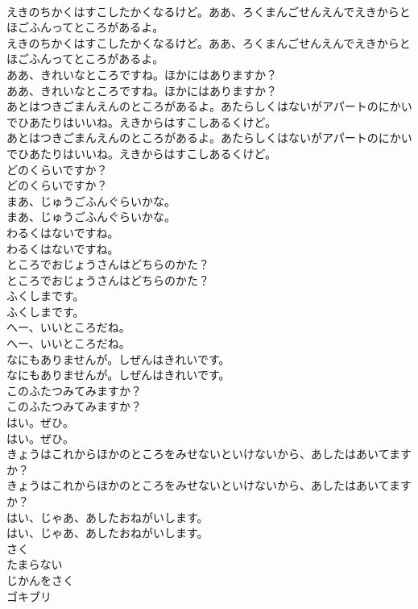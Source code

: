 \documentclass[8pt]{extreport}
\begin{document}
\begin{CJK}{UTF8}{min}
\\	えきのちかくはすこしたかくなるけど。ああ、ろくまんごせんえんでえきからとほごふんってところがあるよ。
\\	えきのちかくはすこしたかくなるけど。ああ、ろくまんごせんえんでえきからとほごふんってところがあるよ。
\\	ああ、きれいなところですね。ほかにはありますか？
\\	ああ、きれいなところですね。ほかにはありますか？
\\	あとはつきごまんえんのところがあるよ。あたらしくはないがアパートのにかいでひあたりはいいね。えきからはすこしあるくけど。
\\	あとはつきごまんえんのところがあるよ。あたらしくはないがアパートのにかいでひあたりはいいね。えきからはすこしあるくけど。
\\	どのくらいですか？
\\	どのくらいですか？
\\	まあ、じゅうごふんぐらいかな。
\\	まあ、じゅうごふんぐらいかな。
\\	わるくはないですね。
\\	わるくはないですね。
\\	ところでおじょうさんはどちらのかた？
\\	ところでおじょうさんはどちらのかた？
\\	ふくしまです。
\\	ふくしまです。
\\	へー、いいところだね。
\\	へー、いいところだね。
\\	なにもありませんが。しぜんはきれいです。
\\	なにもありませんが。しぜんはきれいです。
\\	このふたつみてみますか？
\\	このふたつみてみますか？
\\	はい。ぜひ。
\\	はい。ぜひ。
\\	きょうはこれからほかのところをみせないといけないから、あしたはあいてますか？
\\	きょうはこれからほかのところをみせないといけないから、あしたはあいてますか？
\\	はい、じゃあ、あしたおねがいします。
\\	はい、じゃあ、あしたおねがいします。
\\	さく
\\	たまらない
\\	じかんをさく
\\	ゴキブリ

\end{CJK}
\end{document}
